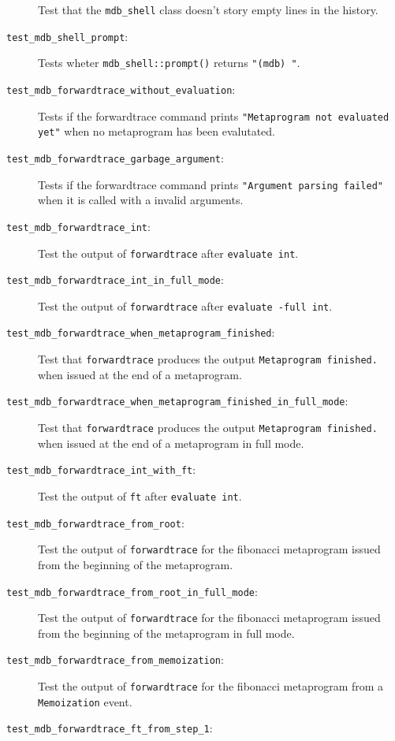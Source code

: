 \begin{description}
        Test that the \texttt{mdb\_shell} class doesn't story empty lines in
        the history.
    \item[\texttt{test\_mdb\_shell\_prompt}:]
        Tests wheter \texttt{mdb\_shell::prompt()} returns \texttt{"(mdb) "}.
    \item[\texttt{test\_mdb\_forwardtrace\_without\_evaluation}:]
        Tests if the forwardtrace command prints
        \texttt{"Metaprogram not evaluated yet"} when no metaprogram has been
        evalutated.
    \item[\texttt{test\_mdb\_forwardtrace\_garbage\_argument}:]
        Tests if the forwardtrace command prints
        \texttt{"Argument parsing failed"} when it is called with a invalid
        arguments.
    \item[\texttt{test\_mdb\_forwardtrace\_int}:]
        Test the output of \texttt{forwardtrace} after \texttt{evaluate int}.
    \item[\texttt{test\_mdb\_forwardtrace\_int\_in\_full\_mode}:]
        Test the output of \texttt{forwardtrace} after
        \texttt{evaluate -full int}.
    \item[\texttt{test\_mdb\_forwardtrace\_when\_metaprogram\_finished}:]
        Test that \texttt{forwardtrace} produces the output
        \texttt{Metaprogram finished.} when issued at the end of a metaprogram.
    \item[\texttt{test\_mdb\_forwardtrace\_when\_metaprogram\_finished\_in\_full\_mode}:]
        Test that \texttt{forwardtrace} produces the output
        \texttt{Metaprogram finished.} when issued at the end of a metaprogram
        in full mode.
    \item[\texttt{test\_mdb\_forwardtrace\_int\_with\_ft}:]
        Test the output of \texttt{ft} after \texttt{evaluate int}.
    \item[\texttt{test\_mdb\_forwardtrace\_from\_root}:]
        Test the output of \texttt{forwardtrace} for the fibonacci metaprogram
        issued from the beginning of the metaprogram.
    \item[\texttt{test\_mdb\_forwardtrace\_from\_root\_in\_full\_mode}:]
        Test the output of \texttt{forwardtrace} for the fibonacci metaprogram
        issued from the beginning of the metaprogram in full mode.
    \item[\texttt{test\_mdb\_forwardtrace\_from\_memoization}:]
        Test the output of \texttt{forwardtrace} for the fibonacci metaprogram
        from a \texttt{Memoization} event.
    \item[\texttt{test\_mdb\_forwardtrace\_ft\_from\_step\_1}:]

\end{description}
